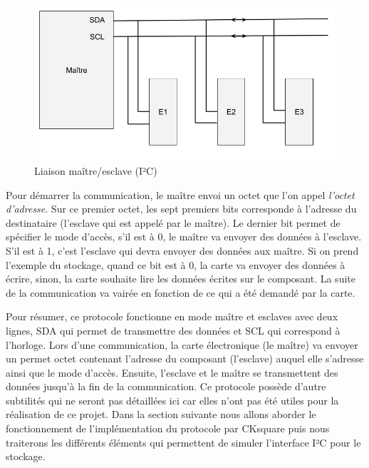 \documentclass[a4paper]{article}
\begin{document}
\begin{figure}[h!]
  \begin{center}
    \includegraphics[scale=0.4]{./img/schema-i2c.png}
    \caption{Liaison maître/esclave (I²C)}
    \label{fig:schemai2c}
  \end{center}
\end{figure}

Pour démarrer la communication, le maître envoi un octet que l'on appel
\textit{l'octet d'adresse}. Sur ce premier octet, les sept premiers bits
corresponde à l'adresse du destinataire (l'esclave qui est appelé par le
maître). Le dernier bit permet de spécifier le mode d'accès, s'il est à 0, le
maître va envoyer des données à l'esclave. S'il est à 1, c'est l'esclave qui
devra envoyer des données aux maître. Si on prend l'exemple du stockage, quand
ce bit est à 0, la carte va envoyer des données à écrire, sinon, la carte
souhaite lire les données écrites sur le composant. La suite de la communication
va vairée en fonction de ce qui a été demandé par la carte.

Pour résumer, ce protocole fonctionne en mode maître et esclaves avec deux
lignes, SDA qui permet de transmettre des données et SCL qui correspond à
l'horloge. Lors d'une communication, la carte électronique (le maître) va
envoyer un permet octet contenant l'adresse du composant (l'esclave) auquel elle
s'adresse ainsi que le mode d'accès. Ensuite, l'esclave et le maître se
transmettent des données jusqu'à la fin de la communication. Ce protocole
possède d'autre subtilités qui ne seront pas détaillées ici car elles n'ont pas
été utiles pour la réalisation de ce projet. Dans la section suivante nous
allons aborder le fonctionnement de l'implémentation du protocole par CKsquare
puis nous traiterons les différents éléments qui permettent de simuler
l'interface I²C pour le stockage.
\end{document}
